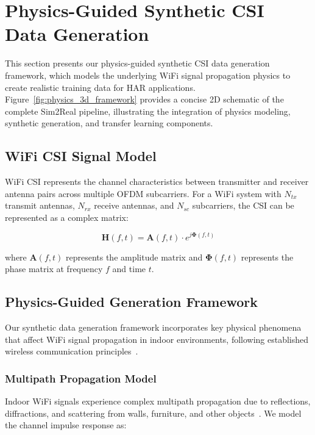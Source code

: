 \documentclass[journal]{IEEEtran}
\begin{document}
\section{Physics-Guided Synthetic CSI Data Generation}

This section presents our physics-guided synthetic CSI data generation framework, which models the underlying WiFi signal propagation physics to create realistic training data for HAR applications. Figure~\ref{fig:physics_3d_framework} provides a concise 2D schematic of the complete Sim2Real pipeline, illustrating the integration of physics modeling, synthetic generation, and transfer learning components.

\subsection{WiFi CSI Signal Model}

WiFi CSI represents the channel characteristics between transmitter and receiver antenna pairs across multiple OFDM subcarriers. For a WiFi system with $N_{tx}$ transmit antennas, $N_{rx}$ receive antennas, and $N_{sc}$ subcarriers, the CSI can be represented as a complex matrix:

\begin{equation}
\mathbf{H}(f,t) = \mathbf{A}(f,t) \cdot e^{j\boldsymbol{\Phi}(f,t)}
\end{equation}

where $\mathbf{A}(f,t)$ represents the amplitude matrix and $\boldsymbol{\Phi}(f,t)$ represents the phase matrix at frequency $f$ and time $t$.

\subsection{Physics-Guided Generation Framework}

Our synthetic data generation framework incorporates key physical phenomena that affect WiFi signal propagation in indoor environments, following established wireless communication principles~\cite{goldsmith2005wireless}.

\subsubsection{Multipath Propagation Model}

Indoor WiFi signals experience complex multipath propagation due to reflections, diffractions, and scattering from walls, furniture, and other objects~\cite{multipath_fading2003}. We model the channel impulse response as:
\end{document}
